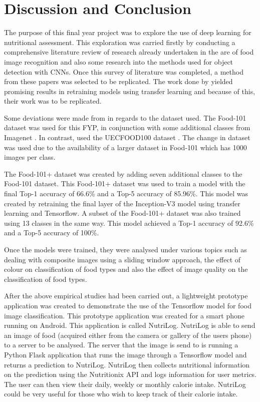 \chapter{Discussion and Conclusion}
The purpose of this final year project was to explore the use of deep learning for nutritional assessment.
This exploration was carried firstly by conducting a comprehensive literature review of research already undertaken in the are of food image recognition and also some research into the methods used for object detection with CNNs.
Once this survey of literature was completed, a method from these papers was selected to be replicated.
The work done by \parencite{yanaiFood} yielded promising results in retraining models using transfer learning and because of this, their work was to be replicated.

Some deviations were made from \parencite{yanaiFood} in regards to the dataset used.
The Food-101 dataset was used for this FYP, in conjunction with some additional classes from Imagenet \parencite{imagenet}.
In contrast, \parencite{yanaiFood} used the UECFOOD100 dataset \parencite{uecFood}.
The change in dataset was used due to the availability of a larger dataset in Food-101 which has 1000 images per class.

The Food-101+ dataset was created by adding seven additional classes to the Food-101 dataset.
This Food-101+ dataset was used to train a model with the final Top-1 accuracy of 66.6\% and a Top-5 accuracy of  85.96\%.
This model was created by retraining the final layer of the Inception-V3 \parencite{rethinkingInception} model using transfer learning and Tensorflow.
A subset of the Food-101+ dataset was also trained using 13 classes in the same way.
This model achieved a Top-1 accuracy of 92.6\% and a Top-5 accuracy of 100\%.

Once the models were trained, they were analysed under various topics such as
dealing with composite images using a sliding window approach, the effect of colour on classification of food types and also the effect of image quality on the classification of food types.

After the above empirical studies had been carried out, a lightweight prototype application was created to demonstrate the use of the Tensorflow model for food image classification.
This prototype application was created for a smart phone running on Android.
This application is called NutriLog.
NutriLog is able to send an image of food (acquired either from the camera or gallery of the users phone) to a server to be analysed.
The server that the image is send to is running a Python Flask application that runs the image through a Tensorflow model and returns a prediction to NutriLog.
NutriLog then collects nutritional information on the prediction using the Nutritionix API and logs information for user metrics.
The user can then view their daily, weekly or monthly calorie intake.
NutriLog could be very useful for those who wish to keep track of their calorie intake.

